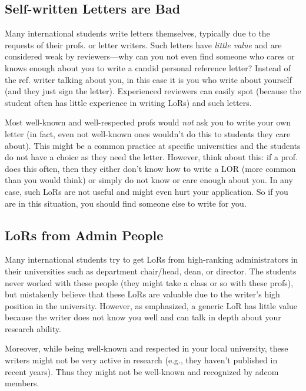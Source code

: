 \documentclass[oneside,11pt,dvipsnames]{book}
\newcommand{\red}[1]{{\color{red}{#1}}}
\begin{document}
\subsection{Self-written Letters are Bad}\label{sec:self-letters}
 Many international students write letters themselves, typically due to the requests of their profs. or letter writers. Such letters have \emph{little value} and are considered weak by reviewers---why can you not even find someone who cares or knows enough about you to write a candid personal reference letter?  Instead of the ref. writer talking about you, in this case it is you who write about yourself (and they just sign the letter). Experienced reviewers can easily spot  (because the student often has little experience in writing LoRs) and  \red{red flag} such letters.

Most well-known and well-respected profs would \emph{not} ask you to write your own letter (in fact, even not well-known ones wouldn't do this to students they care about). This might be a common practice at specific universities and the students do not have a choice as they need the letter.  However, think about this: if a prof. does this often, then they either don't know how to write a LOR (more common than you would think) or simply do not know or care enough about you.  In any case, such LoRs are not useful and might even hurt your application.  So if you are in this situation, you should find someone else to write for you.

\subsection{LoRs from Admin People}\label{sec:admin-letters}

Many international students try to get LoRs from high-ranking administrators in their universities such as department chair/head, dean, or director. The students never worked with these people (they might take a class or so with these profs), but mistakenly believe that these LoRs are valuable due to the writer's high position in the university.
However, as emphasized, a generic LoR has little value because the writer does not know you well and can talk in depth about your research ability. 

Moreover, while being well-known and respected in your local university, these writers might not be very active in research (e.g., they haven't published in recent years). Thus they might not be well-known and recognized by adcom members.  
\end{document}
